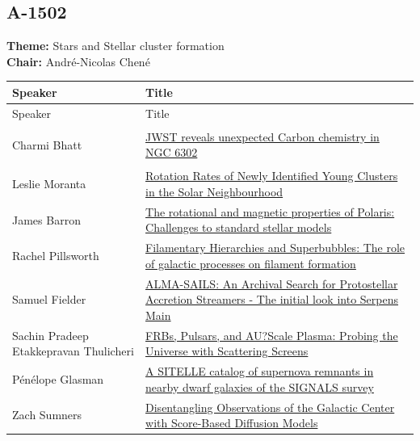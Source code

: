 \subsection*{A-1502}
\textbf{Theme:} Stars and Stellar cluster formation\\
\textbf{Chair:} André-Nicolas Chené\\
{\small
{}
\sloppy
\setlength{\emergencystretch}{1em}
\begin{longtable}{@{}>{\TableRaggedRight\arraybackslash\hspace{0pt}}p{} >{\TableRaggedRight\arraybackslash\hspace{0pt}}p{}@{}}
\toprule
Speaker & Title \\
\midrule
\endfirsthead
\toprule
Speaker & Title \\
\midrule
\endhead
\hypertarget{schedule-talk-326}{}\label{schedule-page-talk-326}Charmi Bhatt & \hyperlink{abstract-talk-326}{JWST reveals unexpected Carbon chemistry in NGC 6302} \\
\hypertarget{schedule-talk-223}{}\label{schedule-page-talk-223}Leslie Moranta & \hyperlink{abstract-talk-223}{Rotation Rates of Newly Identified Young Clusters in the Solar Neighbourhood} \\
\hypertarget{schedule-talk-121}{}\label{schedule-page-talk-121}James Barron & \hyperlink{abstract-talk-121}{The rotational and magnetic properties of Polaris: Challenges to standard stellar models} \\
\hypertarget{schedule-talk-6}{}\label{schedule-page-talk-6}Rachel Pillsworth & \hyperlink{abstract-talk-6}{Filamentary Hierarchies and Superbubbles: The role of galactic processes on filament formation} \\
\hypertarget{schedule-talk-328}{}\label{schedule-page-talk-328}Samuel Fielder & \hyperlink{abstract-talk-328}{ALMA-SAILS: An Archival Search for Protostellar Accretion Streamers - The initial look into Serpens Main} \\
\hypertarget{schedule-talk-164}{}\label{schedule-page-talk-164}Sachin Pradeep Etakkepravan Thulicheri & \hyperlink{abstract-talk-164}{FRBs, Pulsars, and AU?Scale Plasma: Probing the Universe with Scattering Screens} \\
\hypertarget{schedule-talk-101}{}\label{schedule-page-talk-101}Pénélope Glasman & \hyperlink{abstract-talk-101}{A SITELLE catalog of supernova remnants in nearby dwarf galaxies of the SIGNALS survey} \\
\hypertarget{schedule-talk-124}{}\label{schedule-page-talk-124}Zach Sumners & \hyperlink{abstract-talk-124}{Disentangling Observations of the Galactic Center with Score-Based Diffusion Models} \\
\bottomrule
\end{longtable}
}

